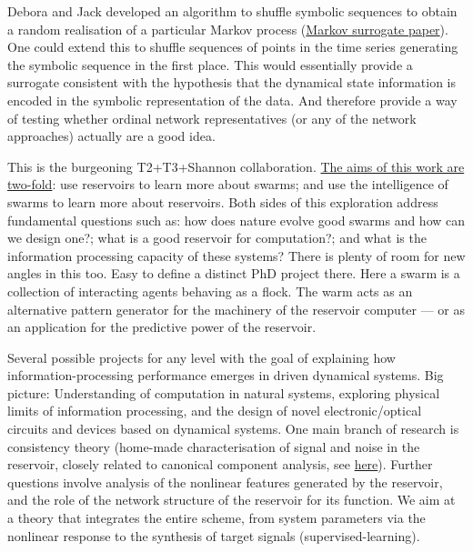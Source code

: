 \documentclass[10pt,a4paper]{Projects}
\begin{document}
\newpage
{}
Debora and Jack developed an algorithm to shuffle symbolic sequences to obtain a random realisation of a particular Markov process (\href{ https://research-repository.uwa.edu.au/en/publications/constrained-markov-order-surrogates}{Markov surrogate paper}). One could extend this to shuffle sequences of points in the time series generating the symbolic sequence in the first place. This would essentially provide a surrogate consistent with the hypothesis that the dynamical state information is encoded in the symbolic representation of the data. And therefore provide a way of testing whether ordinal network representatives (or any of the network approaches) actually are a good idea. 

This is the burgeoning T2+T3+Shannon collaboration. 
\href{https://research-repository.uwa.edu.au/en/publications/learned-emergence-in-selfish-collective-motion}{The aims of this work are two-fold}: use reservoirs to learn more about swarms; and use the intelligence of swarms to learn more about reservoirs. Both sides of this exploration address fundamental questions such as: how does nature evolve good swarms and how can we design one?; what is a good reservoir for computation?; and what is the information processing capacity of these systems?
There is plenty of room for new angles in this too. Easy to define a distinct PhD project there. Here a swarm is a collection of interacting agents behaving as a flock. The warm acts as an alternative pattern generator for the machinery of the reservoir computer --- or as an application for the predictive power of the reservoir.

Several possible projects for any level with the goal of explaining how information-processing performance emerges in driven dynamical systems.
Big picture: Understanding of computation in natural systems, exploring physical limits of information processing, and the design of novel electronic/optical circuits and devices based on dynamical systems.
One main branch of research is consistency theory (home-made characterisation of signal and noise in the reservoir, closely related to canonical component analysis, see \href{https://research-repository.uwa.edu.au/en/publications/consistency-in-echo-state-networks}{here}).
Further questions involve analysis of the nonlinear features generated by the reservoir, and the role of the network structure of the reservoir for its function.
We aim at a theory that integrates the entire scheme, from system parameters via the nonlinear response to the synthesis of target signals (supervised-learning).
 
\end{document}
